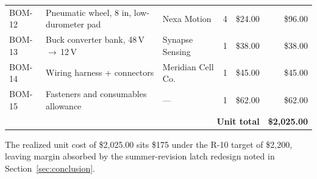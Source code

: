 \begin{longtable}{@{}p{1.15cm}p{4.4cm}lccr@{}}
BOM-12 & Pneumatic wheel, 8 in, low-durometer pad & Nexa Motion & 4 & \$24.00 & \$96.00 \\
BOM-13 & Buck converter bank, 48\,V\,$\to$\,12\,V & Synapse Sensing & 1 & \$38.00 & \$38.00 \\
BOM-14 & Wiring harness + connectors & Meridian Cell Co. & 1 & \$45.00 & \$45.00 \\
BOM-15 & Fasteners and consumables allowance & --- & 1 & \$62.00 & \$62.00 \\
\midrule
\multicolumn{5}{r}{\textbf{Unit total}} & \textbf{\$2{,}025.00} \\
\bottomrule
\end{longtable}

The realized unit cost of \$2{,}025.00 sits \$175 under the R-10 target of
\$2{,}200, leaving margin absorbed by the summer-revision latch redesign
noted in Section~\ref{sec:conclusion}.
